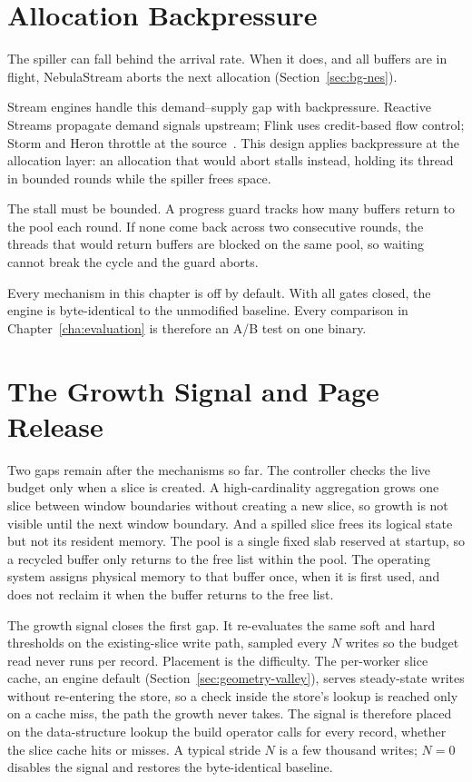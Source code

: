 \section{Allocation Backpressure\label{sec:backpressure}}

The spiller can fall behind the arrival rate.
When it does, and all buffers are in flight, NebulaStream aborts the next allocation (Section~\ref{sec:bg-nes}).

Stream engines handle this demand--supply gap with backpressure.
Reactive Streams propagate demand signals upstream; Flink uses credit-based flow control; Storm and Heron throttle at the source~\cite{reactivestreams,flink_credit,storm886,kulkarni2015heron}.
This design applies backpressure at the allocation layer: an allocation that would abort stalls instead, holding its thread in bounded rounds while the spiller frees space.

The stall must be bounded.
A progress guard tracks how many buffers return to the pool each round.
If none come back across two consecutive rounds, the threads that would return buffers are blocked on the same pool, so waiting cannot break the cycle and the guard aborts.

Every mechanism in this chapter is off by default.
With all gates closed, the engine is byte-identical to the unmodified baseline.
Every comparison in Chapter~\ref{cha:evaluation} is therefore an A/B test on one binary.

\section{The Growth Signal and Page Release\label{sec:growth-release}}

Two gaps remain after the mechanisms so far.
The controller checks the live budget only when a slice is created.
A high-cardinality aggregation grows one slice between window boundaries without creating a new slice, so growth is not visible until the next window boundary.
And a spilled slice frees its logical state but not its resident memory.
The pool is a single fixed slab reserved at startup, so a recycled buffer only returns to the free list within the pool. The operating system assigns physical memory to that buffer once, when it is first used, and does not reclaim it when the buffer returns to the free list.

The growth signal closes the first gap.
It re-evaluates the same soft and hard thresholds on the existing-slice write path, sampled every $N$ writes so the budget read never runs per record.
Placement is the difficulty.
The per-worker slice cache, an engine default (Section~\ref{sec:geometry-valley}), serves steady-state writes without re-entering the store, so a check inside the store's lookup is reached only on a cache miss, the path the growth never takes.
The signal is therefore placed on the data-structure lookup the build operator calls for every record, whether the slice cache hits or misses.
A typical stride $N$ is a few thousand writes; $N = 0$ disables the signal and restores the byte-identical baseline.

